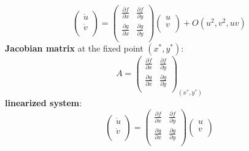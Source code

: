 \documentclass[10pt,aspectratio=43,mathserif,table]{beamer}
\begin{document}
\begin{frame}
    $$
    \left( \begin{array}{c}
        \dot{u}\\
        \dot{v}\\
    \end{array} \right) =\left( \begin{matrix}
        \frac{\partial f}{\partial x}&		\frac{\partial f}{\partial y}\\
        \frac{\partial g}{\partial x}&		\frac{\partial g}{\partial y}\\
    \end{matrix} \right) \left( \begin{array}{c}
        u\\
        v\\
    \end{array} \right) +O\left( u^2,v^2,uv \right) 
    $$
    \textbf{Jacobian matrix} at the fixed point $(x^*,y^*)$:
    $$
    A=\left( \begin{matrix}
        \frac{\partial f}{\partial x}&		\frac{\partial f}{\partial y}\\
        \frac{\partial g}{\partial x}&		\frac{\partial g}{\partial y}\\
    \end{matrix} \right) _{\left( x^*,y^* \right)}
    $$
    \textbf{linearized system}:
    $$
    \left( \begin{array}{c}
        \dot{u}\\
        \dot{v}\\
    \end{array} \right) =\left( \begin{matrix}
        \frac{\partial f}{\partial x}&		\frac{\partial f}{\partial y}\\
        \frac{\partial g}{\partial x}&		\frac{\partial g}{\partial y}\\
    \end{matrix} \right) \left( \begin{array}{c}
        u\\
        v\\
    \end{array} \right) 
    $$

\end{frame}
\end{document}
